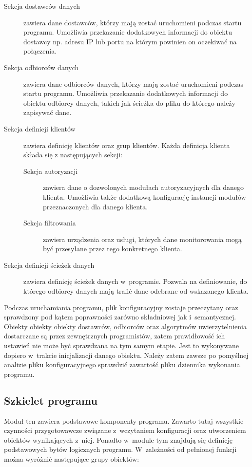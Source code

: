 \begin{description}
\item[Sekcja dostawców danych] zawiera dane dostawców, którzy mają
  zostać uruchomieni podczas startu programu. Umożliwia przekazanie
  dodatkowych informacji do obiektu dostawcy np. adresu IP lub portu
  na którym powinien on oczekiwać na połączenia. 
\item[Sekcja odbiorców danych] zawiera dane odbiorców danych, którzy
  mają zostać uruchomieni podczas startu programu. Umożliwia
  przekazanie dodatkowych informacji do obiektu odbiorcy danych,
  takich jak ścieżka do pliku do którego należy zapisywać dane. 
\item[Sekcja definicji klientów] zawiera definicję klientów oraz grup
  klientów. Każda definicja klienta składa się z następujących sekcji:
  \begin{description}
  \item[Sekcja autoryzacji] zawiera dane o dozwolonych modułach
    autoryzacyjnych dla danego klienta. Umożliwia także dodatkową
    konfigurację instancji modułów przeznaczonych dla danego klienta.
  \item[Sekcja filtrowania] zawiera urządzenia oraz usługi, których
    dane monitorowania mogą być przesyłane przez tego konkretnego
    klienta.
  \end{description}
\item[Sekcja definicji ścieżek danych] zawiera definicję ścieżek
  danych w~programie. Pozwala na definiowanie, do którego odbiorcy
  danych mają trafić dane odebrane od wskazanego klienta.
\end{description}

Podczas uruchamiania programu, plik konfiguracyjny zostaje przeczytany
oraz sprawdzony pod kątem poprawności zarówno składniowej jak
i~semantycznej. Obiekty obiekty obiekty dostawców, odbiorców oraz
algorytmów uwierzytelnienia dostarczane są przez zewnętrznych
programistów, zatem prawidłowość ich ustawień nie może być sprawdzana
na tym samym etapie. Jest to wykonywane dopiero w~trakcie
inicjalizacji danego obiektu. Należy zatem zawsze po pomyślnej
analizie pliku konfiguracyjnego sprawdzić zawartość pliku dziennika
wykonania programu.

\subsection[Szkielet programu][Szkielet programu]{Szkielet programu}

Moduł ten zawiera podstawowe komponenty programu. Zawarto tutaj
wszystkie czynności przygotowawcze związane z~wczytaniem konfiguracji
oraz utworzeniem obiektów wynikających z~niej. Ponadto w~module tym
znajdują się definicję podstawowych bytów logicznych
programu. W~zależności od pełnionej funkcji można wyróżnić następujące
grupy obiektów:

